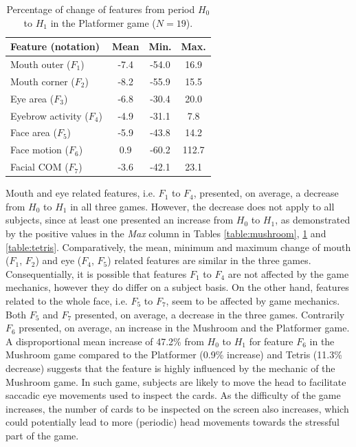 \begin{table}
    \caption{Percentage of change of features from period $H_0$ to $H_1$ in the Platformer game ($N=19$).}
    \label{table:platformer}
    \centering
    \begin{threeparttable}
        \begin{tabular}{lccc}
            \hline
                \textbf{Feature (notation)} & \textbf{Mean} & \textbf{Min.} & \textbf{Max.} \\
            \hline
                Mouth outer ($F_1$)      & -7.4 & -54.0 & 16.9  \\
                Mouth corner ($F_2$)     & -8.2 & -55.9 & 15.5  \\
            \hline
                Eye area ($F_3$)         & -6.8 & -30.4 & 20.0  \\
                Eyebrow activity ($F_4$) & -4.9 & -31.1 & 7.8   \\
            \hline
                Face area ($F_5$)        & -5.9 & -43.8 & 14.2  \\
                Face motion ($F_6$)      & 0.9  & -60.2 & 112.7 \\
                Facial COM ($F_7$)       & -3.6 & -42.1 & 23.1  \\
            \hline
        \end{tabular}
        \begin{tablenotes}
          \small
          \item[]{}
        \end{tablenotes}
    \end{threeparttable}
\end{table}

Mouth and eye related features, i.e. $F_1$ to $F_4$, presented, on average, a decrease from $H_0$ to $H_1$ in all three games. However, the decrease does not apply to all subjects, since at least one presented an increase from $H_0$ to $H_1$, as demonstrated by the positive values in the \textit{Max} column in Tables \ref{table:mushroom}, \ref{table:platformer} and \ref{table:tetris}. Comparatively, the mean, minimum and maximum change of mouth ($F_1$, $F_2$) and eye ($F_4$, $F_5$) related features are similar in the three games. Consequentially, it is possible that features $F_1$ to $F_4$ are not affected by the game mechanics, however they do differ on a subject basis. On the other hand, features related to the whole face, i.e. $F_5$ to $F_7$, seem to be affected by game mechanics. Both $F_5$ and $F_7$ presented, on average, a decrease in the three games. Contrarily $F_6$ presented, on average, an increase in the Mushroom and the Platformer game. A disproportional mean increase of 47.2\% from $H_0$ to $H_1$ for feature $F_6$ in the Mushroom game compared to the Platformer (0.9\% increase) and Tetris (11.3\% decrease) suggests that the feature is highly influenced by the mechanic of the Mushroom game. In such game, subjects are likely to move the head to facilitate saccadic eye movements used to inspect the cards. As the difficulty of the game increases, the number of cards to be inspected on the screen also increases, which could potentially lead to more (periodic) head movements towards the stressful part of the game.


